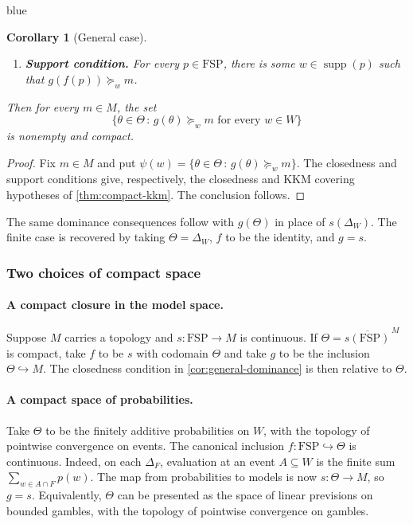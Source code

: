 \documentclass[11pt]{article}
\newtheorem{corollary}[theorem]{Corollary}
\theoremstyle{definition}
\theoremstyle{remark}
\newcommand{\supp}{\operatorname{supp}}
\newcommand{\given}{\,:\,}
\newcommand{\FSP}{\mathrm{FSP}}
\newenvironment{AIwritten}{\begin{color}{blue}}{\end{color}}
\begin{document}
\begin{AIwritten}
\begin{corollary}[General case]
\begin{enumerate}
			\item \textbf{Support condition.}
			For every $p\in\FSP$, there is some $w\in\supp(p)$
			such that $g(f(p))\succeq_w m$.
		\end{enumerate}
		Then for every $m\in M$, the set
		\[
		\{\theta\in\Theta\given
		g(\theta)\succeq_w m \text{ for every }w\in W\}
		\]
		is nonempty and compact.
	\end{corollary}
	
	\begin{proof}
		Fix $m\in M$ and put
		$\psi(w)=\{\theta\in\Theta\given g(\theta)\succeq_w m\}$.
		The closedness and support conditions give, respectively,
		the closedness and KKM covering hypotheses of
		\cref{thm:compact-kkm}. The conclusion follows.
	\end{proof}
	
	The same dominance consequences follow with $g(\Theta)$ in place
	of $s(\Delta_W)$. The finite case is recovered by taking
	$\Theta=\Delta_W$, $f$ to be the identity, and $g=s$.
	
	\subsubsection{Two choices of compact space}
	
	\paragraph{A compact closure in the model space.}
	Suppose $M$ carries a topology and
	$s\colon\FSP\to M$ is continuous. If
	$\Theta=\overline{s(\FSP)}^{\,M}$ is compact, take $f$ to be
	$s$ with codomain $\Theta$ and take $g$ to be the inclusion
	$\Theta\hookrightarrow M$. The closedness condition in
	\cref{cor:general-dominance} is then relative to $\Theta$.
	
	\paragraph{A compact space of probabilities.}
	Take $\Theta$ to be the finitely additive probabilities on $W$,
	with the topology of pointwise convergence on events. The
	canonical inclusion $f\colon\FSP\hookrightarrow\Theta$ is continuous.
	Indeed, on each $\Delta_F$, evaluation at an event $A\subseteq W$
	is the finite sum $\sum_{w\in A\cap F}p(w)$. The map from
	probabilities to models is now $s\colon\Theta\to M$, so $g=s$.
	Equivalently, $\Theta$ can be presented as the space of linear
	previsions on bounded gambles, with the topology of pointwise
	convergence on gambles.
	

\end{AIwritten}
\end{document}
